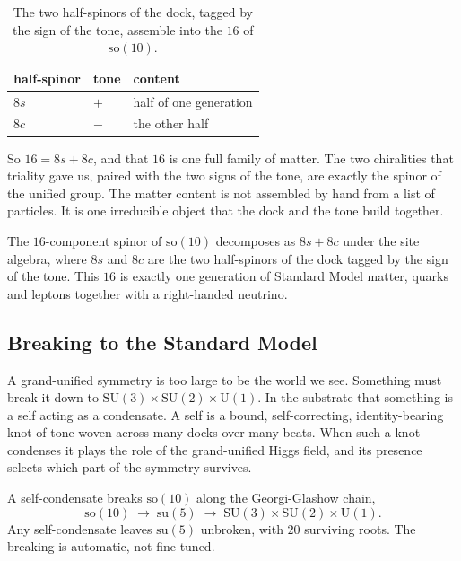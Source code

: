 \begin{table}[ht]
\centering
\begin{tabular}{@{}lll@{}}
\toprule
half-spinor & tone & content \\
\midrule
$8s$ & $+$ & half of one generation \\
$8c$ & $-$ & the other half \\
\bottomrule
\end{tabular}
\caption{The two half-spinors of the dock, tagged by the sign of the tone, assemble into the $16$ of $\mathrm{so}(10)$.}
\label{tab:so10-spinor}
\end{table}

So $16 = 8s + 8c$, and that $16$ is one full family of matter. The two chiralities that triality gave us, paired with the two signs of the tone, are exactly the spinor of the unified group. The matter content is not assembled by hand from a list of particles. It is one irreducible object that the dock and the tone build together.

\begin{proposition}
The $16$-component spinor of $\mathrm{so}(10)$ decomposes as $8s + 8c$ under the site algebra, where $8s$ and $8c$ are the two half-spinors of the dock tagged by the sign of the tone. This $16$ is exactly one generation of Standard Model matter, quarks and leptons together with a right-handed neutrino.
\end{proposition}

\subsection{Breaking to the Standard Model}

A grand-unified symmetry is too large to be the world we see. Something must break it down to $\mathrm{SU}(3) \times \mathrm{SU}(2) \times \mathrm{U}(1)$. In the substrate that something is a self acting as a condensate. A self is a bound, self-correcting, identity-bearing knot of tone woven across many docks over many beats. When such a knot condenses it plays the role of the grand-unified Higgs field, and its presence selects which part of the symmetry survives.

\begin{result}
A self-condensate breaks $\mathrm{so}(10)$ along the Georgi-Glashow chain,
\[
\mathrm{so}(10) \;\longrightarrow\; \mathrm{su}(5) \;\longrightarrow\; \mathrm{SU}(3) \times \mathrm{SU}(2) \times \mathrm{U}(1).
\]
Any self-condensate leaves $\mathrm{su}(5)$ unbroken, with $20$ surviving roots. The breaking is automatic, not fine-tuned.
\end{result}

